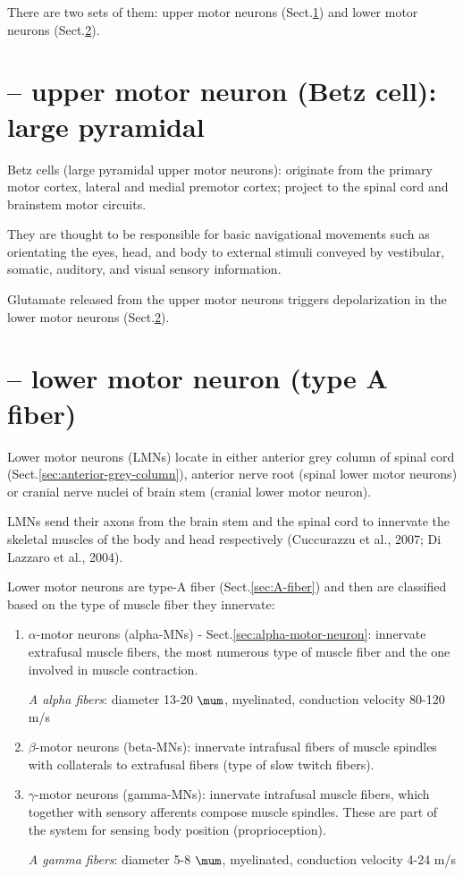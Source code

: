 There are two sets of them: upper motor neurons
(Sect.\ref{sec:upper-motor-neuron}) and lower motor neurons
(Sect.\ref{sec:lower-motor-neuron}).



\section{-- upper motor neuron (Betz cell): large pyramidal}
\label{sec:upper-motor-neuron}
\label{sec:Betz-cell}

Betz  cells (large pyramidal upper motor neurons): originate from the
primary motor cortex, lateral and medial premotor cortex; project to the
spinal  cord and brainstem motor circuits.
  
They are thought to be responsible for basic navigational movements such as
orientating the eyes, head, and body to external stimuli conveyed by vestibular,
somatic, auditory, and visual sensory information.

Glutamate released from the upper motor neurons triggers depolarization in the
lower motor neurons (Sect.\ref{sec:lower-motor-neuron}).
  
\section{-- lower motor neuron (type A fiber)}
\label{sec:lower-motor-neuron}

Lower motor neurons (LMNs) locate in either anterior grey column of spinal cord
(Sect.\ref{sec:anterior-grey-column}), anterior nerve root (spinal lower motor
neurons) or cranial nerve nuclei of brain stem (cranial lower motor neuron).

LMNs send their axons from the brain stem and the spinal cord to innervate the
skeletal muscles of the body and head respectively (Cuccurazzu et al., 2007; Di
Lazzaro et al., 2004).

Lower motor neurons are type-A fiber (Sect.\ref{sec:A-fiber}) and then are
classified based on the type of muscle fiber they innervate:
\begin{enumerate}
  \item $\alpha$-motor neurons (alpha-MNs) - Sect.\ref{sec:alpha-motor-neuron}: 
  innervate extrafusal muscle fibers, the most numerous type of muscle fiber and
  the one involved in muscle contraction.

{\it A alpha fibers}: diameter 13-20 $\mum$, myelinated, conduction velocity
    80-120 m/s
  
  \item $\beta$-motor neurons (beta-MNs): 
  innervate intrafusal fibers of muscle spindles with collaterals to extrafusal
  fibers (type of slow twitch fibers).
  
  \item $\gamma$-motor neurons (gamma-MNs):
   innervate intrafusal muscle fibers, which together with sensory afferents
  compose muscle spindles. These are part of the system for sensing body
  position (proprioception). 

{\it A gamma fibers}: diameter 5-8 $\mum$, myelinated, conduction velocity
    4-24 m/s

\end{enumerate}

